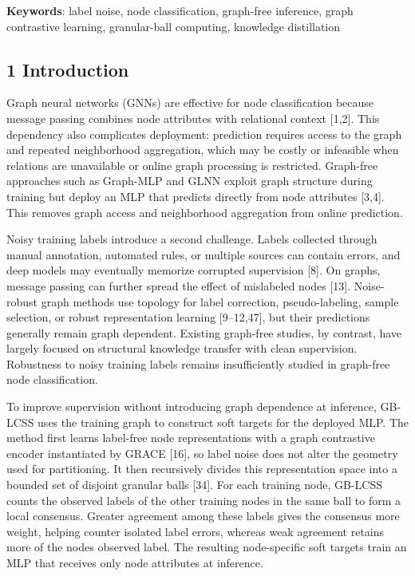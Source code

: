 \textbf{Keywords}: label noise, node classification, graph-free inference, graph contrastive learning, granular-ball computing, knowledge distillation

\subsection{1 Introduction}\label{introduction}

Graph neural networks (GNNs) are effective for node classification because message passing combines node attributes with relational context {[}1,2{]}. This dependency also complicates deployment: prediction requires access to the graph and repeated neighborhood aggregation, which may be costly or infeasible when relations are unavailable or online graph processing is restricted. Graph-free approaches such as Graph-MLP and GLNN exploit graph structure during training but deploy an MLP that predicts directly from node attributes {[}3,4{]}. This removes graph access and neighborhood aggregation from online prediction.

Noisy training labels introduce a second challenge. Labels collected through manual annotation, automated rules, or multiple sources can contain errors, and deep models may eventually memorize corrupted supervision {[}8{]}. On graphs, message passing can further spread the effect of mislabeled nodes {[}13{]}. Noise-robust graph methods use topology for label correction, pseudo-labeling, sample selection, or robust representation learning {[}9--12,47{]}, but their predictions generally remain graph dependent. Existing graph-free studies, by contrast, have largely focused on structural knowledge transfer with clean supervision. Robustness to noisy training labels remains insufficiently studied in graph-free node classification.

To improve supervision without introducing graph dependence at inference, GB-LCSS uses the training graph to construct soft targets for the deployed MLP. The method first learns label-free node representations with a graph contrastive encoder instantiated by GRACE {[}16{]}, so label noise does not alter the geometry used for partitioning. It then recursively divides this representation space into a bounded set of disjoint granular balls {[}34{]}. For each training node, GB-LCSS counts the observed labels of the other training nodes in the same ball to form a local consensus. Greater agreement among these labels gives the consensus more weight, helping counter isolated label errors, whereas weak agreement retains more of the node\textquotesingle s observed label. The resulting node-specific soft targets train an MLP that receives only node attributes at inference.


